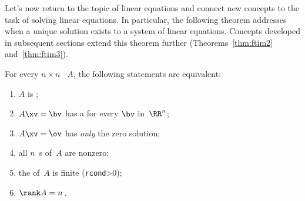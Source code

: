





Let's now return to the topic of linear equations and connect new concepts to the task of solving linear equations.
In particular, the following theorem addresses when a unique solution exists to a system of linear equations.
Concepts developed in subsequent sections extend this theorem further (Theorems~\ref{thm:ftim2} and~\ref{thm:ftim3}).


\begin{theorem} \label{thm:ftim1} 
For every \(n\times n\) ~\(A\), the following statements are equivalent: 
\begin{enumerate}
\item\label{thm:ftim1i} \(A\) is ;
\item\label{thm:ftim1ii} \(A\xv=\bv\) has a  for every \(\bv\) in~\(\RR^n\);
\item\label{thm:ftim1iii} \(A\xv=\ov\) has \emph{only} the zero solution;
\item\label{thm:ftim1iv} all \(n\)~s of~\(A\) are nonzero;
\item\label{thm:ftim1ivx} the  of~\(A\) is finite (\verb|rcond|>0);
\item\label{thm:ftim1v} \(\rank A=n\)\,.
\end{enumerate}
\end{theorem}

